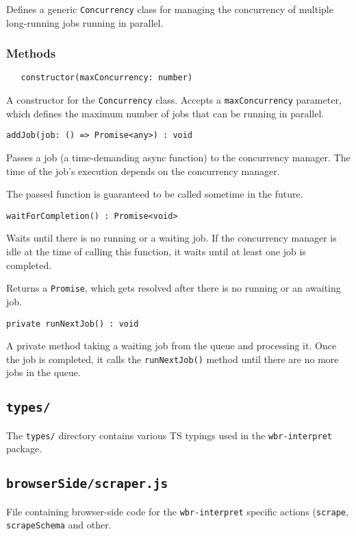 Defines a generic \texttt{Concurrency} class for managing the concurrency of multiple long-running jobs running in parallel.

\subsubsection{Methods}

\verb|   constructor(maxConcurrency: number)|
\smallskip

A constructor for the \texttt{Concurrency} class.
Accepts a \texttt{maxConcurrency} parameter, which defines the maximum number of jobs that can be running in parallel.

\emptyline
\verb|addJob(job: () => Promise<any>) : void |
\smallskip

Passes a job (a time-demanding async function) to the concurrency manager. 
The time of the job's execution depends on the concurrency manager.

The passed function is guaranteed to be called sometime in the future.

\emptyline
\verb|waitForCompletion() : Promise<void>|
\smallskip

Waits until there is no running or a waiting job.
If the concurrency manager is idle at the time of calling this function,
it waits until at least one job is completed.

Returns a \texttt{Promise}, which gets resolved after there is no running or an awaiting job.

\emptyline
\verb|private runNextJob() : void|
\smallskip

A private method taking a waiting job from the queue and processing it. 
Once the job is completed, it calls the \texttt{runNextJob()} method until there are no more jobs in the queue.

\subsection{\texttt{types/}}

The \texttt{types/} directory contains various \acs{TS} typings used in the \texttt{wbr-interpret} package.

\subsection{\texttt{browserSide/scraper.js}}

File containing browser-side code for the \texttt{wbr-interpret} specific actions (\texttt{scrape}, \texttt{scrapeSchema} and other.

